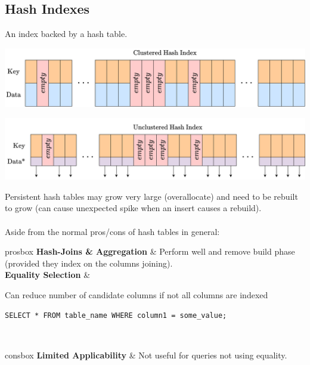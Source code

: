 \subsection{Hash Indexes}
An index backed by a hash table.
\begin{center}
    \includegraphics[width=.8\textwidth]{algorithms_and_indices/images/hash_index_clustered.drawio.png}
\end{center}
\begin{center}
    \includegraphics[width=.8\textwidth]{algorithms_and_indices/images/hash_index_unclustered.drawio.png}
\end{center}
Persistent hash tables may grow very large (overallocate) and need to be rebuilt to grow (can cause unexpected spike when an insert causes a rebuild).
\\
\\ Aside from the normal pros/cons of hash tables in general:
\begin{tabbox}[.7\textwidth]{prosbox}
    \textbf{Hash-Joins \& Aggregation} & Perform well and remove build phase (provided they index on the columns joining). \\
    \textbf{Equality Selection} & {Can reduce number of candidate columns if not all columns are indexed
    \begin{verbatim}
SELECT * FROM table_name WHERE column1 = some_value;
    \end{verbatim}
    } \\
\end{tabbox}

\begin{tabbox}{consbox}
    \textbf{Limited Applicability} & Not useful for queries not using equality. \\
\end{tabbox}

